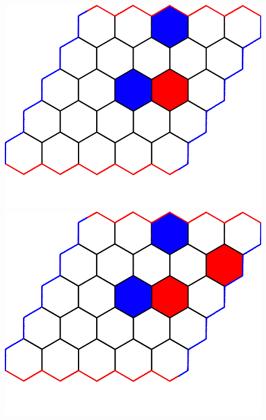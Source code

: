 \documentclass[a4paper]{article}
\begin{document}
\begin{figure}[t]
\begin{minipage}[t]{.24\linewidth}
    \includegraphics[width=\linewidth]{figures/example_game/ex_game_t3.png}
    \end{minipage}
    \begin{minipage}[t]{.24\linewidth}
    \includegraphics[width=\linewidth]{figures/example_game/ex_game_t4.png}
    \end{minipage}
    \begin{minipage}[t]{.24\linewidth}

\end{minipage}
\end{figure}
\end{document}

